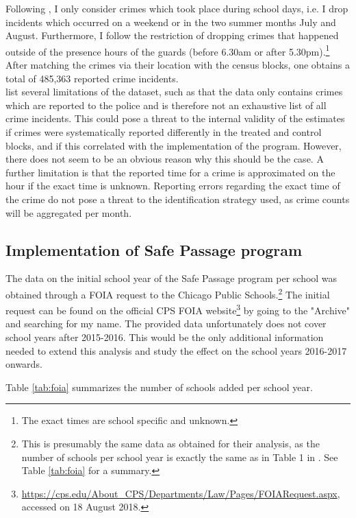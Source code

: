 \documentclass[]{article}
\begin{document}
Following \cite{mcmillen2017}, I only consider crimes which took place during school days, i.e. I drop incidents which occurred on a weekend or in the two summer months July and August. Furthermore, I follow the restriction of dropping crimes that happened outside of the presence hours of the guards (before 6.30am or after 5.30pm).\footnote{The exact times are school specific and unknown.} After matching the crimes via their location with the census blocks, one obtains a total of 485,363 reported crime incidents. \\

\cite{mcmillen2017} list several limitations of the dataset, such as that the data only contains crimes which are reported to the police and is therefore not an exhaustive list of all crime incidents. This could pose a threat to the internal validity of the estimates if crimes were systematically reported differently in the treated and control blocks, and if this correlated with the implementation of the program. However, there does not seem to be an obvious reason why this should be the case.  A further limitation is that the reported time for a crime is approximated on the hour if the exact time is unknown. Reporting errors regarding the exact time of the crime do not pose a threat to the identification strategy used, as crime counts will be aggregated per month.


\subsection{Implementation of Safe Passage program}
\label{sec: foia}
The data on the initial school year of the Safe Passage program per school was obtained through a FOIA request to the Chicago Public Schools.\footnote{This is presumably the same data as \cite{mcmillen2017} obtained for their analysis, as the number of schools per school year is exactly the same as in Table 1 in \cite{mcmillen2017}. See Table \ref{tab:foia} for a summary.} The initial request can be found on the official CPS FOIA website\footnote{\url{https://cps.edu/About_CPS/Departments/Law/Pages/FOIARequest.aspx}, accessed on 18 August 2018.} by going to the "Archive" and searching for my name.  The provided data unfortunately does not cover school years after 2015-2016. This would be the only additional information needed to extend this analysis and study the effect on the school years 2016-2017 onwards.

Table \ref{tab:foia} summarizes the number of schools added per school year.
\end{document}
